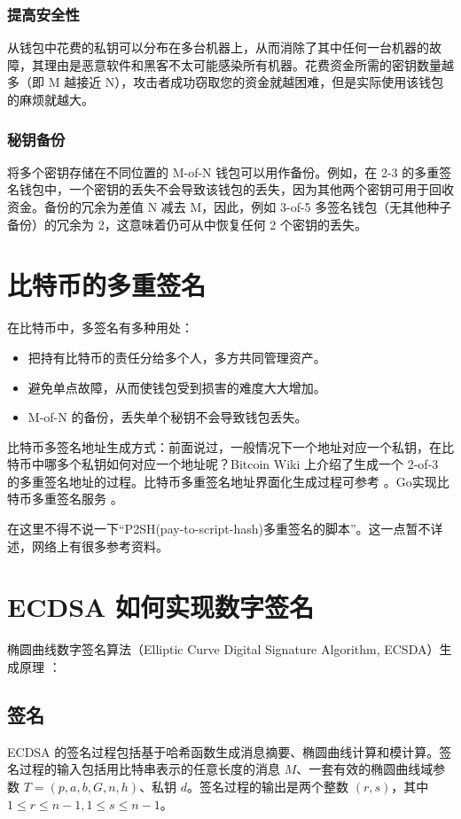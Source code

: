 \documentclass[a4paper,10pt]{article}
\begin{document}
\subsubsection{提高安全性}

从钱包中花费的私钥可以分布在多台机器上，从而消除了其中任何一台机器的故障，其理由是恶意软件和黑客不太可能感染所有机器。花费资金所需的密钥数量越多（即 M 越接近 N），攻击者成功窃取您的资金就越困难，但是实际使用该钱包的麻烦就越大。

\subsubsection{秘钥备份}

将多个密钥存储在不同位置的 M-of-N 钱包可以用作备份。例如，在 2-3 的多重签名钱包中，一个密钥的丢失不会导致该钱包的丢失，因为其他两个密钥可用于回收资金。备份的冗余为差值 N 减去 M，因此，例如 3-of-5 多签名钱包（无其他种子备份）的冗余为 2，这意味着仍可从中恢复任何 2 个密钥的丢失。

\section{比特币的多重签名}
在比特币中，多签名有多种用处：
\begin{itemize}
  \item 把持有比特币的责任分给多个人，多方共同管理资产。
  \item 避免单点故障，从而使钱包受到损害的难度大大增加。
  \item M-of-N 的备份，丢失单个秘钥不会导致钱包丢失。
\end{itemize}

比特币多签名地址生成方式：前面说过，一般情况下一个地址对应一个私钥，在比特币中哪多个私钥如何对应一个地址呢？Bitcoin Wiki \cite{BitCoin Wiki} 上介绍了生成一个 2-of-3 的多重签名地址的过程。比特币多重签名地址界面化生成过程可参考 \cite{比特币多重签名机制使用篇}。Go实现比特币多重签名服务 \cite{Go 实现比特币多重签名服务}。

在这里不得不说一下“P2SH(pay-to-script-hash)多重签名的脚本\cite{P2SH(pay-to-script-hash)多重签名的脚本}”。这一点暂不详述，网络上有很多参考资料。

\section{ECDSA 如何实现数字签名}
椭圆曲线数字签名算法（Elliptic Curve Digital Signature Algorithm, ECSDA）生成原理 \cite{应用密码学}：

\subsection{签名}
ECDSA 的签名过程包括基于哈希函数生成消息摘要、椭圆曲线计算和模计算。签名过程的输入包括用比特串表示的任意长度的消息 \(M\)、一套有效的椭圆曲线域参数 
\(T=(p,a,b,G,n,h)\)、私钥 \(d\)。签名过程的输出是两个整数 \((r,s)\)，其中 \(1\le r\le n-1, 1\le s\le n-1\)。
\end{document}
